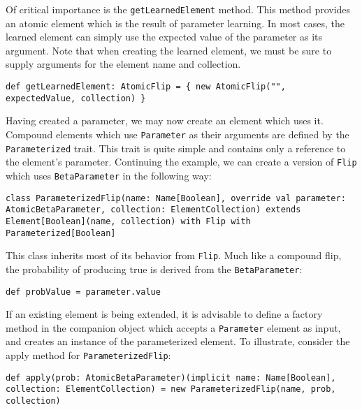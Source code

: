 Of critical importance is the \texttt{getLearnedElement} method. This method provides an atomic element which is the result of parameter learning. In most cases, the learned element can simply use the expected value of the parameter as its argument.  Note that when creating the learned element, we must be sure to supply arguments for the element name and collection.

\begin{flushleft}
\texttt{def getLearnedElement: AtomicFlip = \{
\newline \tab new AtomicFlip("", expectedValue, collection)
\newline \}
}
\end{flushleft}

Having created a parameter, we may now create an element which uses it. Compound elements which use \texttt{Parameter} as their arguments are defined by the \texttt{Parameterized} trait. This trait is quite simple and contains only a reference to the element's parameter. Continuing the example, we can create a version of \texttt{Flip} which uses \texttt{BetaParameter} in the following way:

\begin{flushleft}
\texttt{class ParameterizedFlip(name: Name[Boolean], override val parameter: AtomicBetaParameter, collection: ElementCollection)
\newline extends Element[Boolean](name, collection) with Flip 
\newline with Parameterized[Boolean]
}
\end{flushleft}

This class inherits most of its behavior from \texttt{Flip}. Much like a compound flip, the probability of producing true is derived from the \texttt{BetaParameter}:

\begin{flushleft}
\texttt{def probValue = parameter.value}
\end{flushleft}

If an existing element is being extended, it is advisable to define a factory method in the companion object which accepts a \texttt{Parameter} element as input, and creates an instance of the parameterized element. To illustrate, consider the apply method for \texttt{ParameterizedFlip}:

\begin{flushleft}
\texttt{def apply(prob: AtomicBetaParameter)(implicit name: Name[Boolean], collection: ElementCollection) =
\newline \tab new ParameterizedFlip(name, prob, collection)
}
\end{flushleft}

